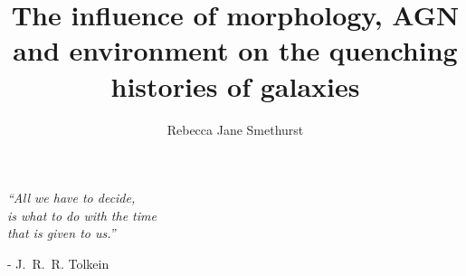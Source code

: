 \documentclass[12pt,useAMS]{ociamthesis}  %
\title{The influence of morphology, AGN and environment on the quenching histories of galaxies}   %
\author{Rebecca Jane Smethurst}             %
\begin{document}
 
\setcounter{secnumdepth}{3}
\setcounter{tocdepth}{3}


\maketitle                  %

\newpage
\vspace*{3cm}
\begin{center}
\emph{``All we have to decide, \\ is what to do with the time \\ that is given to us.''} \\\end{center} \begin{flushright}- J.~R.~R. Tolkein\end{flushright}

\newpage
\end{document}
